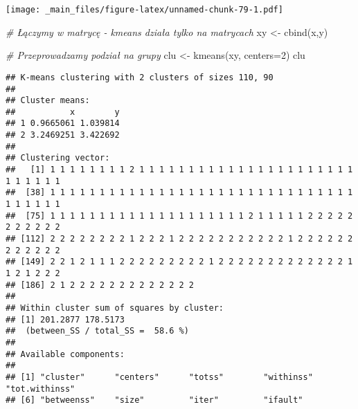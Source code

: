 \documentclass[
]{book}
\newenvironment{Shaded}{\begin{snugshade}}{\end{snugshade}}
\newcommand{\AttributeTok}[1]{\textcolor[rgb]{0.77,0.63,0.00}{#1}}
\newcommand{\CommentTok}[1]{\textcolor[rgb]{0.56,0.35,0.01}{\textit{#1}}}
\newcommand{\DecValTok}[1]{\textcolor[rgb]{0.00,0.00,0.81}{#1}}
\newcommand{\FunctionTok}[1]{\textcolor[rgb]{0.00,0.00,0.00}{#1}}
\newcommand{\NormalTok}[1]{#1}
\newcommand{\OtherTok}[1]{\textcolor[rgb]{0.56,0.35,0.01}{#1}}
\newcommand{\SpecialCharTok}[1]{\textcolor[rgb]{0.00,0.00,0.00}{#1}}
\begin{document}
\texttt{[image: \_main\_files/figure-latex/unnamed-chunk-79-1.pdf]}

\begin{Shaded}
\begin{Highlighting}[]
\CommentTok{\# Łączymy w matrycę {-} kmeans działa tylko na matrycach}
\NormalTok{xy }\OtherTok{\textless{}{-}} \FunctionTok{cbind}\NormalTok{(x,y)}

\CommentTok{\# Przeprowadzamy podział na grupy}
\NormalTok{clu }\OtherTok{\textless{}{-}} \FunctionTok{kmeans}\NormalTok{(xy, }\AttributeTok{centers=}\DecValTok{2}\NormalTok{)}
\NormalTok{clu}
\end{Highlighting}
\end{Shaded}

\begin{verbatim}
## K-means clustering with 2 clusters of sizes 110, 90
## 
## Cluster means:
##           x        y
## 1 0.9665061 1.039814
## 2 3.2469251 3.422692
## 
## Clustering vector:
##   [1] 1 1 1 1 1 1 1 1 2 1 1 1 1 1 1 1 1 1 1 1 1 1 1 1 1 1 1 1 1 1 1 1 1 1 1 1 1
##  [38] 1 1 1 1 1 1 1 1 1 1 1 1 1 1 1 1 1 1 1 1 1 1 1 1 1 1 1 1 1 1 1 1 1 1 1 1 1
##  [75] 1 1 1 1 1 1 1 1 1 1 1 1 1 1 1 1 1 1 1 1 2 1 1 1 1 1 2 2 2 2 2 2 2 2 2 2 2
## [112] 2 2 2 2 2 2 2 2 1 2 2 2 1 2 2 2 2 2 2 2 2 2 2 2 1 2 2 2 2 2 2 2 2 2 2 2 2
## [149] 2 2 1 2 1 1 1 2 2 2 2 2 2 2 2 2 1 2 2 2 2 2 2 2 2 2 2 2 2 2 1 1 2 1 2 2 2
## [186] 2 1 2 2 2 2 2 2 2 2 2 2 2 2 2
## 
## Within cluster sum of squares by cluster:
## [1] 201.2877 178.5173
##  (between_SS / total_SS =  58.6 %)
## 
## Available components:
## 
## [1] "cluster"      "centers"      "totss"        "withinss"     "tot.withinss"
## [6] "betweenss"    "size"         "iter"         "ifault"
\end{verbatim}

\begin{Shaded}
\end{Shaded}
\end{document}
